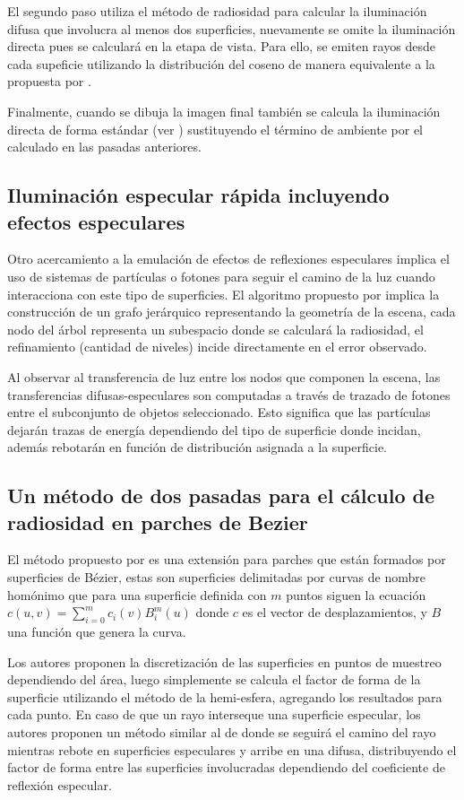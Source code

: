 El segundo paso utiliza el método de radiosidad para calcular la iluminación difusa que involucra al menos dos superficies, nuevamente se omite la iluminación directa pues se calculará en la etapa de vista. Para ello, se emiten rayos desde cada supeficie utilizando la distribución del coseno de manera equivalente a la propuesta por \citeauthor{Malley}. 

Finalmente, cuando se dibuja la imagen final también se calcula la iluminación directa de forma estándar (ver \cite{Whitted}) sustituyendo el término de ambiente por el calculado en las pasadas anteriores.

\subsection{Iluminación especular rápida incluyendo efectos especulares}

Otro acercamiento a la emulación de efectos de reflexiones especulares implica el uso de sistemas de partículas o fotones para seguir el camino de la luz cuando interacciona con este tipo de superficies. El algoritmo propuesto por \citeauthor{Granier} implica la construcción de un grafo jerárquico representando la geometría de la escena, cada nodo del árbol representa un subespacio donde se calculará la radiosidad, el refinamiento (cantidad de niveles) incide directamente en el error observado.

Al observar al transferencia de luz entre los nodos que componen la escena, las transferencias difusas-especulares son computadas a través de trazado de fotones entre el subconjunto de objetos seleccionado. Esto significa que las partículas dejarán trazas de energía dependiendo del tipo de superficie donde incidan, además rebotarán en función de distribución asignada a la superficie.

\subsection{Un método de dos pasadas para el cálculo de radiosidad en parches de Bezier}

El método propuesto por \citeauthor{Kok} es una extensión para parches que están formados por superficies de Bézier, estas son superficies delimitadas por curvas de nombre homónimo que para una superficie definida con $m$ puntos siguen la ecuación $c(u,v) = \sum_{i=0}^{m} c_{i}(v)B_{i}^{m}(u)$ donde $c$ es el vector de desplazamientos, y $B$ una función que genera la curva.

Los autores proponen la discretización de las superficies en puntos de muestreo dependiendo del área, luego simplemente se calcula el factor de forma de la superficie utilizando el método de la hemi-esfera, agregando los resultados para cada punto. En caso de que un rayo interseque una superficie especular, los autores proponen un método similar al de \citeauthor{Sillion} donde se seguirá el camino del rayo mientras rebote en superficies especulares y arribe en una difusa, distribuyendo el factor de forma entre las superficies involucradas dependiendo del coeficiente de reflexión especular.